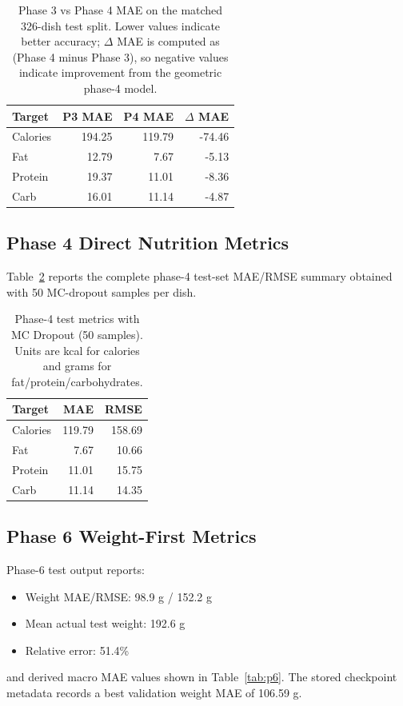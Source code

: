 \documentclass[10pt,twocolumn,letterpaper]{article}
\begin{document}
\begin{table}[t]
\centering
\caption{Phase 3 vs Phase 4 MAE on the matched 326-dish test split. Lower values indicate better accuracy; $\Delta$ MAE is computed as (Phase 4 minus Phase 3), so negative values indicate improvement from the geometric phase-4 model.}
\label{tab:p34}
\begin{tabular}{lrrr}
\toprule
Target & P3 MAE & P4 MAE & $\Delta$ MAE \\
\midrule
Calories & 194.25 & 119.79 & -74.46 \\
Fat      & 12.79  & 7.67   & -5.13 \\
Protein  & 19.37  & 11.01  & -8.36 \\
Carb     & 16.01  & 11.14  & -4.87 \\
\bottomrule
\end{tabular}
\end{table}

\subsection{Phase 4 Direct Nutrition Metrics}
Table~\ref{tab:p4full} reports the complete phase-4 test-set MAE/RMSE summary obtained with 50 MC-dropout samples per dish.
\begin{table}[t]
\centering
\caption{Phase-4 test metrics with MC Dropout (50 samples). Units are kcal for calories and grams for fat/protein/carbohydrates.}
\label{tab:p4full}
\begin{tabular}{lrr}
\toprule
Target & MAE & RMSE \\
\midrule
Calories & 119.79 & 158.69 \\
Fat      & 7.67   & 10.66 \\
Protein  & 11.01  & 15.75 \\
Carb     & 11.14  & 14.35 \\
\bottomrule
\end{tabular}
\end{table}

\subsection{Phase 6 Weight-First Metrics}
Phase-6 test output reports:
\begin{itemize}
\item Weight MAE/RMSE: 98.9 g / 152.2 g
\item Mean actual test weight: 192.6 g
\item Relative error: 51.4\%
\end{itemize}
and derived macro MAE values shown in Table~\ref{tab:p6}. The stored checkpoint metadata records a best validation weight MAE of 106.59 g.
\end{document}
